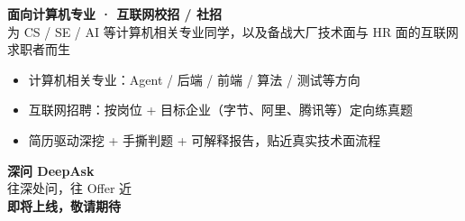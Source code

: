 \documentclass[11pt,a4paper]{ctexart}
\begin{document}
\clearpage
\vspace*{2.2cm}
\begin{center}
  {\LARGE\bfseries\color{DeepIndigo} 面向计算机专业 · 互联网校招 / 社招}\\[0.55em]
  {\normalsize\color{TextMuted}
    为 CS / SE / AI 等计算机相关专业同学，以及备战大厂技术面与 HR 面的互联网求职者而生
  }

  \vspace{1.6em}
  \begin{tcolorbox}[
    enhanced, arc=6mm, boxrule=0.5pt,
    colback=white, colframe=CardBorder,
    width=0.84\textwidth, left=12pt, right=12pt
  ]
    \begin{itemize}[
      leftmargin=1.2em, itemsep=8pt,
      label={\color{DeepSky}\textbf{→}}
    ]
      \item 计算机相关专业：Agent / 后端 / 前端 / 算法 / 测试等方向
      \item 互联网招聘：按岗位 + 目标企业（字节、阿里、腾讯等）定向练真题
      \item 简历驱动深挖 + 手撕判题 + 可解释报告，贴近真实技术面流程
    \end{itemize}
  \end{tcolorbox}

  \vfill
  \begin{tcolorbox}[
    enhanced, arc=10mm, boxrule=0pt,
    colback=DeepIndigo, coltext=white,
    width=0.76\linewidth, halign=center,
    drop fuzzy shadow
  ]
    {\fontsize{22}{26}\selectfont\bfseries 深问 DeepAsk}\\[0.45em]
    {\large\color{white!88} 往深处问，往 Offer 近}\\[0.65em]
    {\normalsize\bfseries\color{DeepCyan!35!white} 即将上线，敬请期待}
  \end{tcolorbox}
  \vfill
\end{center}
\end{document}
